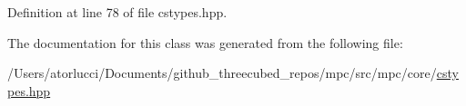 Definition at line 78 of file cstypes.\+hpp.



The documentation for this class was generated from the following file\+:\begin{DoxyCompactItemize}
\item 
/\+Users/atorlucci/\+Documents/github\+\_\+threecubed\+\_\+repos/mpc/src/mpc/core/\mbox{\hyperlink{cstypes_8hpp}{cstypes.\+hpp}}\end{DoxyCompactItemize}
